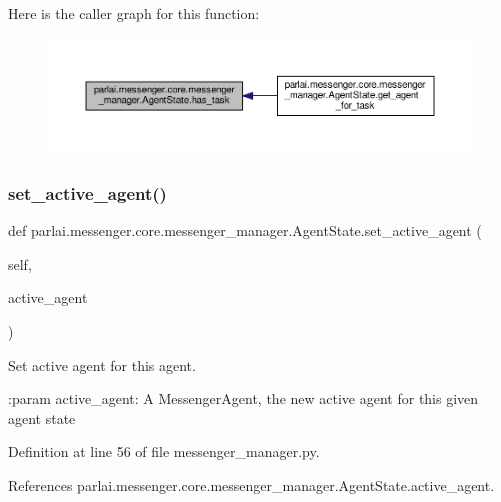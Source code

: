 Here is the caller graph for this function\+:
\nopagebreak
\begin{figure}[H]
\begin{center}
\leavevmode
\includegraphics[width=350pt]{classparlai_1_1messenger_1_1core_1_1messenger__manager_1_1AgentState_af642027e7465f3c99e4000c0eeb9292c_icgraph}
\end{center}
\end{figure}
\mbox{\label{classparlai_1_1messenger_1_1core_1_1messenger__manager_1_1AgentState_aad23c5c7b3c908f385b93581255662fb}} 
\subsubsection{\texorpdfstring{set\+\_\+active\+\_\+agent()}{set\_active\_agent()}}
{\footnotesize\ttfamily def parlai.\+messenger.\+core.\+messenger\+\_\+manager.\+Agent\+State.\+set\+\_\+active\+\_\+agent (\begin{DoxyParamCaption}\item[{}]{self,  }\item[{}]{active\+\_\+agent }\end{DoxyParamCaption})}

\begin{DoxyVerb}Set active agent for this agent.

:param active_agent:
    A MessengerAgent, the new active agent for this given agent state\end{DoxyVerb}
 

Definition at line 56 of file messenger\+\_\+manager.\+py.



References parlai.\+messenger.\+core.\+messenger\+\_\+manager.\+Agent\+State.\+active\+\_\+agent.



